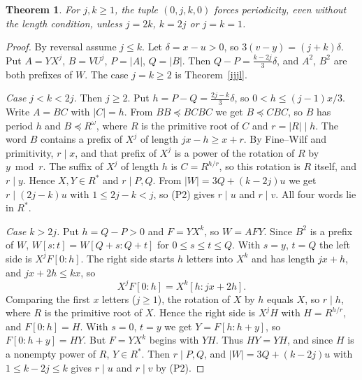 \documentclass[11pt]{article}
\newtheorem{theorem}{Theorem}
\theoremstyle{remark}\newtheorem*{remark}{Remark}
\begin{document}
\begin{theorem}\label{0jk0}
For \(j,k\ge1\), the tuple \((0,j,k,0)\) forces periodicity, even without the length condition, unless \(j=2k\), \(k=2j\) or \(j=k=1\).
\end{theorem}
\begin{proof}
By reversal assume \(j\le k\). Let \(\delta=x-u>0\), so \(3(v-y)=(j+k)\delta\). Put \(A=YX^j\), \(B=VU^j\), \(P=|A|\), \(Q=|B|\). Then \(Q-P=\tfrac{k-2j}{3}\delta\), and \(A^2\), \(B^2\) are both prefixes of \(W\). The case \(j=k\ge2\) is Theorem~\ref{ijjl}.

\emph{Case \(j<k<2j\).} Then \(j\ge2\). Put \(h=P-Q=\tfrac{2j-k}{3}\delta\), so \(0<h\le(j-1)x/3\). Write \(A=BC\) with \(|C|=h\). From \(BB\preceq BCBC\) we get \(B\preceq CBC\), so \(B\) has period \(h\) and \(B\preceq R^\omega\), where \(R\) is the primitive root of \(C\) and \(r=|R|\mid h\). The word \(B\) contains a prefix of \(X^j\) of length \(jx-h\ge x+r\). By Fine--Wilf and primitivity, \(r\mid x\), and that prefix of \(X^j\) is a power of the rotation of \(R\) by \(y\bmod r\). The suffix of \(X^j\) of length \(h\) is \(C=R^{h/r}\), so this rotation is \(R\) itself, and \(r\mid y\). Hence \(X,Y\in R^*\) and \(r\mid P,Q\). From \(|W|=3Q+(k-2j)u\) we get \(r\mid(2j-k)u\) with \(1\le 2j-k<j\), so (P2) gives \(r\mid u\) and \(r\mid v\). All four words lie in \(R^*\).

\emph{Case \(k>2j\).} Put \(h=Q-P>0\) and \(F=YX^k\), so \(W=AFY\). Since \(B^2\) is a prefix of \(W\), \(W[s:t]=W[Q+s:Q+t]\) for \(0\le s\le t\le Q\). With \(s=y\), \(t=Q\) the left side is \(X^jF[0:h]\). The right side starts \(h\) letters into \(X^k\) and has length \(jx+h\), and \(jx+2h\le kx\), so
\[X^jF[0:h]=X^k[h:jx+2h].\]
Comparing the first \(x\) letters (\(j\ge1\)), the rotation of \(X\) by \(h\) equals \(X\), so \(r\mid h\), where \(R\) is the primitive root of \(X\). Hence the right side is \(X^jH\) with \(H=R^{h/r}\), and \(F[0:h]=H\). With \(s=0\), \(t=y\) we get \(Y=F[h:h+y]\), so \(F[0:h+y]=HY\). But \(F=YX^k\) begins with \(YH\). Thus \(HY=YH\), and since \(H\) is a nonempty power of \(R\), \(Y\in R^*\). Then \(r\mid P,Q\), and \(|W|=3Q+(k-2j)u\) with \(1\le k-2j\le k\) gives \(r\mid u\) and \(r\mid v\) by (P2).
\end{proof}
\end{document}
